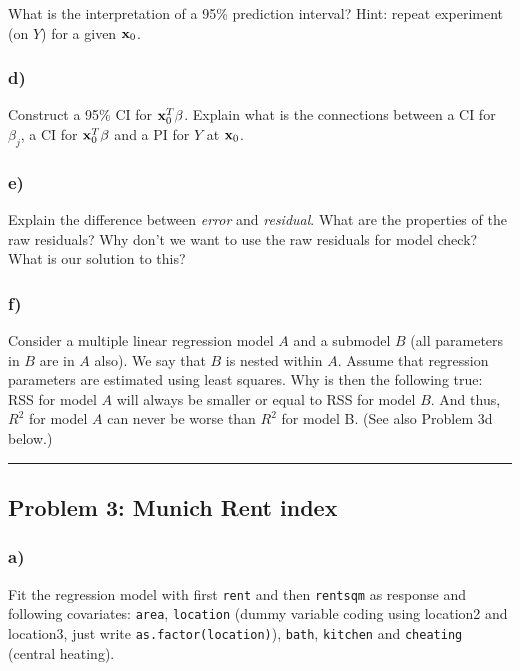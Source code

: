\documentclass[]{article}
\begin{document}
What is the interpretation of a 95\% prediction interval? Hint: repeat
experiment (on \(Y\)) for a given \({\bf x}_0\).

\subsubsection{d)}\label{d}

Construct a 95\% CI for \({\bf x}_0^T \beta\). Explain what is the
connections between a CI for \(\beta_j\), a CI for \({\bf x}_0^T \beta\)
and a PI for \(Y\) at \({\bf x}_0\).

\subsubsection{e)}\label{e}

Explain the difference between \emph{error} and \emph{residual}. What
are the properties of the raw residuals? Why don't we want to use the
raw residuals for model check? What is our solution to this?

\subsubsection{f)}\label{f}

Consider a multiple linear regression model \(A\) and a submodel \(B\)
(all parameters in \(B\) are in \(A\) also). We say that \(B\) is nested
within \(A\). Assume that regression parameters are estimated using
least squares. Why is then the following true: RSS for model \(A\) will
always be smaller or equal to RSS for model \(B\). And thus, \(R^2\) for
model \(A\) can never be worse than \(R^2\) for model B. (See also
Problem 3d below.)

\begin{center}\rule{0.5\linewidth}{\linethickness}\end{center}

\subsection{Problem 3: Munich Rent
index}\label{problem-3-munich-rent-index}

\subsubsection{a)}\label{a-1}

Fit the regression model with first \texttt{rent} and then
\texttt{rentsqm} as response and following covariates: \texttt{area},
\texttt{location} (dummy variable coding using location2 and location3,
just write \texttt{as.factor(location)}), \texttt{bath},
\texttt{kitchen} and \texttt{cheating} (central heating).
\end{document}

